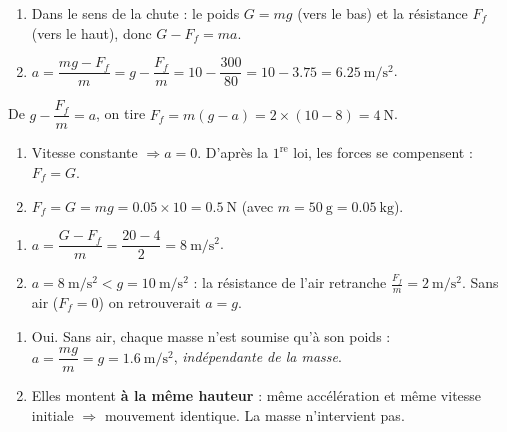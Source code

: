 \documentclass[11pt,a4paper]{article}
\begin{document}

\begin{corrige}
\begin{enumerate}[label=\alph*)]
  \item Dans le sens de la chute : le poids $G=mg$ (vers le bas) et la résistance $F_f$ (vers le haut),
        donc $G-F_f=ma$.
  \item $a=\dfrac{mg-F_f}{m}=g-\dfrac{F_f}{m}=10-\dfrac{300}{80}=10-\num{3,75}=\qty{6,25}{\metre\per\second\squared}$.
\end{enumerate}
\end{corrige}

\begin{corrige}
De $g-\dfrac{F_f}{m}=a$, on tire $F_f=m(g-a)=2\times(10-8)=\qty{4}{\newton}$.
\end{corrige}

\begin{corrige}
\begin{enumerate}[label=\alph*)]
  \item Vitesse constante $\Rightarrow a=0$. D'après la $1^{\text{re}}$ loi, les forces se compensent :
        $F_f=G$.
  \item $F_f=G=mg=\num{0,05}\times 10=\qty{0,5}{\newton}$ (avec $m=\qty{50}{\gram}=\qty{0,05}{\kilogram}$).
\end{enumerate}
\end{corrige}

\begin{corrige}[pourquoi $a<g$ ?]
\begin{enumerate}[label=\alph*)]
  \item $a=\dfrac{G-F_f}{m}=\dfrac{20-4}{2}=\qty{8}{\metre\per\second\squared}$.
  \item $a=\qty{8}{\metre\per\second\squared}<g=\qty{10}{\metre\per\second\squared}$ : la résistance de l'air
        retranche $\tfrac{F_f}{m}=\qty{2}{\metre\per\second\squared}$. Sans air ($F_f=0$) on retrouverait $a=g$.
\end{enumerate}
\end{corrige}

\begin{corrige}
\begin{enumerate}[label=\alph*)]
  \item Oui. Sans air, chaque masse n'est soumise qu'à son poids : $a=\dfrac{mg}{m}=g=\qty{1,6}{\metre\per\second\squared}$,
        \emph{indépendante de la masse}.
  \item Elles montent \textbf{à la même hauteur} : même accélération et même vitesse initiale $\Rightarrow$
        mouvement identique. La masse n'intervient pas.
\end{enumerate}
\end{corrige}
\end{document}
